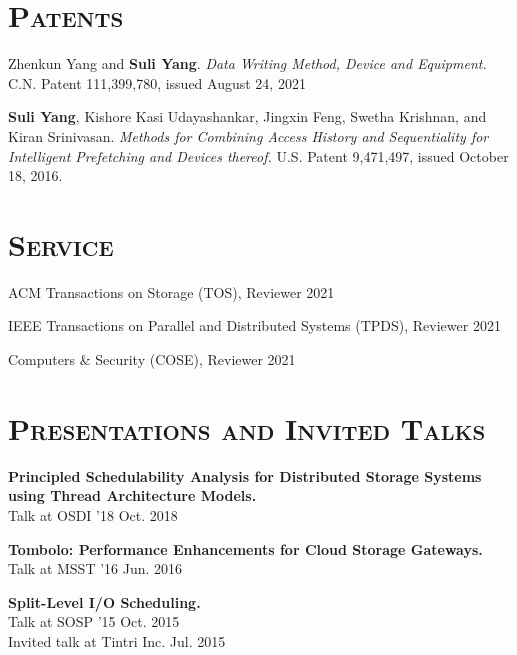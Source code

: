 \documentclass[10pt, letterpaper]{article}
\renewenvironment{itemize}{
  \begin{list}{}{
    \setlength{\leftmargin}{1.2em}
    \setlength{\itemsep}{0.12em}
    \setlength{\parskip}{0pt}
    \setlength{\parsep}{0.12em}
  }
}{
  \end{list}
}
\begin{document}
\section*{\textsc{Patents}}
\begin{enumerate}[fullwidth,itemindent=1.1em,label={[\arabic*]}]
    \item Zhenkun Yang and {\bf Suli Yang}. \textit{Data Writing Method, Device and Equipment.} C.N. Patent 111,399,780, issued August 24, 2021

     \item {\bf Suli Yang}, Kishore Kasi Udayashankar, Jingxin Feng, Swetha Krishnan, and Kiran Srinivasan. \textit{Methods for Combining Access History and Sequentiality for Intelligent Prefetching and Devices thereof.} U.S. Patent 9,471,497, issued October 18, 2016.

\end{enumerate}


\section*{\textsc{Service}}
\begin{itemize}
	\item ACM Transactions on Storage (TOS), Reviewer \hfill 2021
        \item IEEE Transactions on Parallel and Distributed Systems (TPDS), Reviewer \hfill 2021
	\item Computers \& Security (COSE), Reviewer \hfill 2021
\end{itemize}

\section*{\textsc{Presentations and Invited Talks}}
\begin{itemize}
       \item {\bf{Principled Schedulability Analysis for Distributed Storage Systems using Thread Architecture Models.}} \\
        {\small{Talk at OSDI '18}} \hfill Oct. 2018

       \item {\bf{Tombolo: Performance Enhancements for Cloud Storage Gateways.}} \\
        {\small{Talk at MSST '16}}  \hfill Jun. 2016
       
       \item {\bf{Split-Level I/O Scheduling.}} \\
        {\small{Talk at SOSP '15}}  \hfill Oct. 2015\\
	{\small{Invited talk at Tintri Inc.}}	   \hfill Jul. 2015
\end{itemize}

\end{document}
